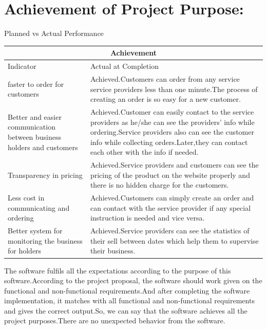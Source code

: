 \documentclass[13pt]{extarticle}
\begin{document}
\section{\textbf{Achievement of Project Purpose:}}
\begin{center}
Planned vs Actual Performance\\
\begin{tabular}{ |p{5cm}|p{5cm}|  }
\hline
\multicolumn{2}{|c|}{Achievement} \\
\hline
Indicator & Actual at Completion\\
\hline
faster to order for customers & Achieved.Customers can order from any service service providers less than one minute.The process of creating an order is so easy for a new customer.\\
\hline
Better and easier communication between business holders and customers & Achieved.Customer can easily contact to the service providers as he/she can see the providers' info while ordering.Service providers also can see the customer info while collecting orders.Later,they can contact each other with the info if needed.\\
\hline
Transparency in pricing & Achieved.Service providers and customers can see the pricing of the product on the website properly and there is no hidden charge for the customers.\\
\hline
Less cost in communicating and ordering & Achieved.Customers can simply create an order and can contact with the service provider if any special instruction is needed and vice versa.\\
\hline
Better system for monitoring the business for holders & Achieved.Service providers can see the statistics of their sell between dates which help them to supervise their business. \\
\hline
\end{tabular}
\end{center}
The software fulfils all the expectations according to the purpose of this software.According to the project proposal, the software should work given on the functional and non-functional requirements.And after completing the software implementation, it matches with all functional and non-functional requirements and gives the correct output.So, we can say that the software achieves all the project purposes.There are no unexpected behavior from the software.
\newpage
\end{document}
